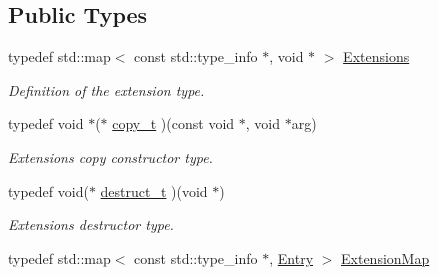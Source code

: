 \subsection*{Public Types}
\begin{DoxyCompactItemize}
\item 
typedef std::map$<$ const std::type\_\-info $\ast$, void $\ast$ $>$ \hyperlink{class_d_d4hep_1_1_object_extensions_a882c1e22567a450f60d83eb735dd3532}{Extensions}
\begin{DoxyCompactList}\small\item\em Definition of the extension type. \item\end{DoxyCompactList}\item 
typedef void $\ast$($\ast$ \hyperlink{class_d_d4hep_1_1_object_extensions_ab58b60490186d1adc0c5585ad691a7c2}{copy\_\-t} )(const void $\ast$, void $\ast$arg)
\begin{DoxyCompactList}\small\item\em Extensions copy constructor type. \item\end{DoxyCompactList}\item 
typedef void($\ast$ \hyperlink{class_d_d4hep_1_1_object_extensions_af9ca2813f0d7fa65ac13d905d9721cdf}{destruct\_\-t} )(void $\ast$)
\begin{DoxyCompactList}\small\item\em Extensions destructor type. \item\end{DoxyCompactList}\item 
typedef std::map$<$ const std::type\_\-info $\ast$, \hyperlink{struct_d_d4hep_1_1_object_extensions_1_1_entry}{Entry} $>$ \hyperlink{class_d_d4hep_1_1_object_extensions_a22c0e42d5fdc9f3fda39c2c3bec14341}{ExtensionMap}
\end{DoxyCompactItemize}
